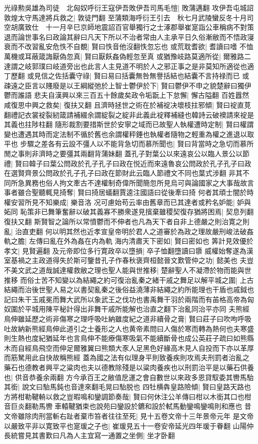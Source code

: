 光祿勲吳雄為司徒　北匈奴呼衍王寇伊吾敗伊吾司馬毛愷|{
	敗蒲邁翻}
攻伊吾屯城詔敦煌太守馬達將兵救之|{
	敦徒門翻}
至蒲類海呼衍王引去　秋七月武陵蠻反冬十月司空胡廣致仕　十一月辛巳京師地震詔百官舉獨行之士涿郡舉崔寔詣公車稱病不對策退而論世事名曰政論其辭曰凡天下所以不治者常由人主承平日久俗漸敝而不悟政寖衰而不改習亂安危怢不自覩|{
	賢曰怢音他沒翻怢忽忘也}
或荒耽耆欲|{
	耆讀曰嗜}
不恤萬機或耳蔽箴誨厭偽忽真|{
	賢曰厭飫姦偽輕忽至真}
或猶豫岐路莫適所從|{
	爾雅路二達謂之岐郭璞曰岐道旁出也此言人主見道不明於人之邪正事之是非莫知所適從也適丁歷翻}
或見信之佐括囊守祿|{
	賢曰易曰括囊無咎無譽括結也結囊不言持禄而已}
或疎遠之臣言以賤廢是以王綱縱弛於上智士鬱伊於下|{
	賢曰鬱伊不申之貌楚辭曰獨伊鬱而誰語}
悲夫自漢興以來三百五十餘歲矣政令垢翫上下怠懈|{
	懈古隘翻}
百姓囂然咸復思中興之救矣|{
	復扶又翻}
且濟時拯世之術在於補䘺决壞枝拄邪傾|{
	賢曰䘺直莧翻禮記衣裳䘺裂紉箴請補綴余謂綻裂之綻非此義此䘺釋補縫也韓詩云破襖請來䘺是其義也拄陟柱翻}
隨形裁割要措斯世於安寧之域而已故聖人執權遭時定制|{
	賢曰權謂變也遭遇其時而定法制不循於舊也余謂權秤錘也執權者隨物之輕重為權之進退以取平也}
步驟之差各有云設不彊人以不能背急切而慕所聞也|{
	賢曰背當時之急切而慕所閒之事則非濟時之要彊其兩翻背蒲妹翻}
蓋孔子對葉公以來遠哀公以臨人景公以節禮|{
	賢曰韓子曰葉公問政於孔子孔子曰政在悦近而來遠魯哀公問政於孔子孔子曰政在選賢齊景公問政於孔子孔子曰政在節財此云臨人節禮文不同也葉式涉翻}
非其不同所急異務也俗人拘文牽古不達權制奇偉所聞簡忽所見烏可與論國家之大事哉故言事者雖合聖聽輒見掎奪|{
	賢曰掎居蟻翻賈逵注國語曰從後牽曰掎}
何者其頑士闇於時權安習所見不知樂成|{
	樂音洛}
况可慮始苟云率由舊章而已其達者或矜名妒能|{
	妒與妬同}
恥策非已舞筆奮辭以破其義寡不勝衆遂見擯棄雖稷契復存猶將困焉|{
	契息列翻復扶又翻}
斯賢智之論所以常憤鬱而不伸者也凡為天下者自非上德嚴之則治寛之則亂|{
	治直吏翻}
何以明其然也近孝宣皇帝明於君人之道審於為政之理故嚴刑峻法破姦軌之膽|{
	左傳曰亂在外為姦在内為軌}
海内清肅天下密如|{
	賢曰密如也}
筭計見效優於孝文|{
	見賢遍翻}
及元帝即位多行寛政卒以墮損|{
	卒子恤翻墮讀曰隳}
威權始奪遂為漢室基禍之主政道得失於斯可鑒昔孔子作春秋褒齊桓懿晉文歎管仲之功|{
	懿美也}
夫豈不美文武之道哉誠達權救敝之理也聖人能與世推移|{
	楚辭聖人不凝滯於物而能與世推移}
而俗士苦不知變以為結繩之約可復治亂秦之緒干戚之舞足以解平城之圍|{
	上古結繩而治後世聖人易之以書契亂秦之後俗益澆薄非結繩之約所能理也干盾也戚鉞也記曰朱干玉戚冕而舞大武所以象武王之伐功也書禹舞干羽於兩階而有苖格高帝為匈奴圍於平城用陳平秘計得出非舞干戚所能解也治直之翻下治亂同治平亦同}
夫熊經鳥伸雖延歷之術非傷寒之理呼吸吐納雖度紀之道非續骨之膏|{
	賢曰莊子曰吹呴呼吸吐故納新熊經鳥伸此道引之士養形之人也黄帝素問曰人傷於寒而轉為熱何也夫寒盛則生熱也度紀猶延年也言鳥伸不能療傷寒吸氣不能續斷骨也成公英莊子疏曰如熊縣木而自經鳥飛空而伸足爾雅翼曰熊類大豕人足黑色好緣高木見人自投而下亦以革厚而筋駑用此自快故稱熊經}
蓋為國之法有似理身平則致養疾則攻焉夫刑罰者治亂之藥石也德教者興平之粱肉也夫以德教除殘是以粱肉養疾也以刑罰治平是以藥石供養也|{
	供音恭養余兩翻}
方今承百王之敝值戹運之會自數世以來政多恩貸馭委其轡馬駘其銜|{
	說文曰駘馬鈍也音達來翻毛晃曰駘脱也}
四牡横犇皇路險傾|{
	賢曰皇路天路也}
方將柑勒鞬輈以救之豈暇鳴和鑾調節奏哉|{
	賢曰何休注公羊傳曰柑以木銜其口也柑音巨炎翻勒馬轡車轅鞬猶束也說苑曰鑾設於鑣和設於軾馬動鑾鳴鑾鳴則和應也}
昔文帝雖除肉刑當斬右趾者棄市笞者往往至死|{
	見十五卷文帝十三年景帝元年}
是文帝以嚴致平非以寛致平也寔瑗之子也|{
	崔瑗見五十一卷安帝延光四年瑗于眷翻}
山陽仲長統嘗見其書歎曰凡為人主宜寫一通置之坐側|{
	坐才卧翻}


